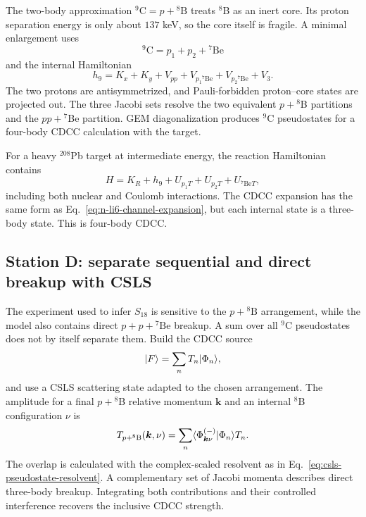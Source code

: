 The two-body approximation $^9\mathrm C=p+{}^8\mathrm B$ treats $^8$B as an
inert core.  Its proton separation energy is only about $137$ keV, so the core
itself is fragile.  A minimal enlargement uses
\begin{equation}
  {}^9\mathrm C=p_1+p_2+{}^7\mathrm{Be}
  \label{eq:9c-clusters}
\end{equation}
and the internal Hamiltonian
\begin{equation}
  h_9=K_x+K_y+V_{pp}
  +V_{p_1{}^7\mathrm{Be}}
  +V_{p_2{}^7\mathrm{Be}}+V_3.
  \label{eq:9c-three-body-H}
\end{equation}
The two protons are antisymmetrized, and Pauli-forbidden proton--core states
are projected out.  The three Jacobi sets resolve the two equivalent
$p+{}^8$B partitions and the $pp+{}^7$Be partition.  GEM diagonalization
produces $^9$C pseudostates for a four-body CDCC calculation with the target.

For a heavy $^{208}$Pb target at intermediate energy, the reaction Hamiltonian
contains
\begin{equation}
  H=K_R+h_9+U_{p_1T}+U_{p_2T}+U_{{}^7\mathrm{Be}T},
  \label{eq:9c-Pb-H}
\end{equation}
including both nuclear and Coulomb interactions.  The CDCC expansion has the
same form as Eq.~\eqref{eq:n-li6-channel-expansion}, but each internal state is
a three-body state.  This is four-body CDCC.

\subsection{Station D: separate sequential and direct breakup with CSLS}
\label{subsec:lab-9c-csls}

The experiment used to infer $S_{18}$ is sensitive to the
$p+{}^8\mathrm B$ arrangement, while the model also contains direct
$p+p+{}^7\mathrm{Be}$ breakup.  A sum over all $^9$C pseudostates does not by
itself separate them.  Build the CDCC source
\begin{equation}
  \lvert F \rangle=\sum_nT_n\lvert \Phi_n \rangle,
  \label{eq:9c-cdcc-source}
\end{equation}
and use a CSLS scattering state adapted to the chosen arrangement.  The
amplitude for a final $p+{}^8$B relative momentum $\bm k$ and an internal
$^8$B configuration $\nu$ is
\begin{equation}
  T_{p+{}^8\mathrm B}(\bm k,\nu)
  =\sum_n
  \langle \Phi_{\bm k\nu}^{(-)}|\Phi_n \rangle T_n.
  \label{eq:9c-arrangement-amplitude}
\end{equation}
The overlap is calculated with the complex-scaled resolvent as in
Eq.~\eqref{eq:csls-pseudostate-resolvent}.  A complementary set of Jacobi
momenta describes direct three-body breakup.  Integrating both contributions
and their controlled interference recovers the inclusive CDCC strength.

